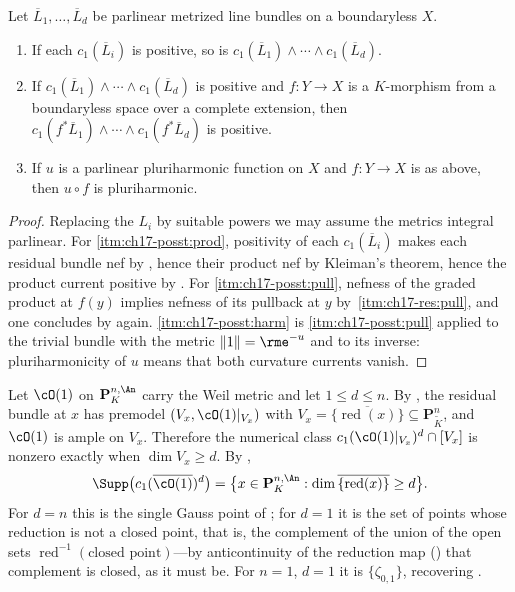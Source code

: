 \begin{corollary}
\label{cor:ch17-positivity-stability}
Let $\overline L_1,\dots,\overline L_d$ be parlinear metrized line bundles
on a boundaryless $X$.
\begin{enumerate}
\item\label{itm:ch17-posst:prod}
 If each $c_1(\overline L_i)$ is positive, so is
 $c_1(\overline L_1)\wedge\cdots\wedge c_1(\overline L_d)$.
\item\label{itm:ch17-posst:pull}
 If $c_1(\overline L_1)\wedge\cdots\wedge c_1(\overline L_d)$ is positive
 and $f:Y\to X$ is a $K$-morphism from a boundaryless space over a
 complete extension, then
 $c_1(f^*\overline L_1)\wedge\cdots\wedge c_1(f^*\overline L_d)$ is
 positive.
\item\label{itm:ch17-posst:harm}
 If $u$ is a parlinear pluriharmonic function on $X$ and $f:Y\to X$ is
 as above, then $u\circ f$ is pluriharmonic.
\end{enumerate}
\end{corollary}

\begin{proof}
Replacing the $L_i$ by suitable powers we may assume the metrics integral
parlinear.  For \cref{itm:ch17-posst:prod}, positivity of each
$c_1(\overline L_i)$ makes each residual bundle nef by
, hence their product nef by Kleiman's
theorem, hence the product current positive by
.  For \cref{itm:ch17-posst:pull}, nefness
of the graded product at $f(y)$ implies nefness of its pullback at $y$
by \,\cref{itm:ch17-res:pull}, and one
concludes by  again.
\cref{itm:ch17-posst:harm} is \cref{itm:ch17-posst:pull} applied to the
trivial bundle with the metric $\|1\|=\rme^{-u}$ and to its inverse:
pluriharmonicity of $u$ means that both curvature currents vanish.
\end{proof}

\begin{example}
\label{ex:ch17-support-projective}
Let $\cO(1)$ on $\mathbf P^{n,\An}_K$ carry the Weil metric and let
$1\le d\le n$.  By , the residual bundle at
$x$ has premodel $(V_x,\cO(1)|_{V_x})$ with
$V_x=\overline{\{\operatorname{red}(x)\}}\subseteq\mathbf P^n_{\widetilde K}$,
and $\cO(1)$ is ample on $V_x$.  Therefore the numerical class
$c_1(\cO(1)|_{V_x})^d\cap[V_x]$ is nonzero exactly when
$\dim V_x\ge d$.  By ,
\[
 \Supp\bigl(c_1(\overline{\cO(1)})^d\bigr)
 =\bigl\{x\in\mathbf P^{n,\An}_K:
   \dim\overline{\{\operatorname{red}(x)\}}\ge d\bigr\}.
\]
For $d=n$ this is the single Gauss point of
; for $d=1$ it is the set of
points whose reduction is not a closed point, that is, the complement of the
union of the open sets $\operatorname{red}^{-1}(\text{closed point})$---by
anticontinuity of the reduction map
() that complement is closed, as it
must be.  For $n=1$, $d=1$ it is $\{\zeta_{0,1}\}$, recovering
.
\end{example}

